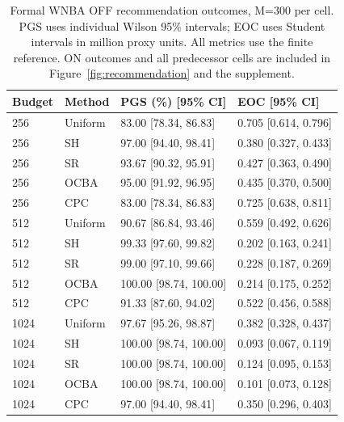 \begin{table}[tbp]\centering\footnotesize
\caption{Formal WNBA OFF recommendation outcomes, M=300 per cell. PGS uses individual Wilson 95\% intervals; EOC uses Student intervals in million proxy units. All metrics use the finite reference. ON outcomes and all predecessor cells are included in Figure~\ref{fig:recommendation} and the supplement.}\label{tab:recommendation}
\begin{tabularx}{\linewidth}{llXX}\toprule
Budget & Method & PGS (\%) [95\% CI] & EOC [95\% CI] \\ \midrule
256 & Uniform & 83.00 [78.34, 86.83] & 0.705 [0.614, 0.796] \\
256 & SH & 97.00 [94.40, 98.41] & 0.380 [0.327, 0.433] \\
256 & SR & 93.67 [90.32, 95.91] & 0.427 [0.363, 0.490] \\
256 & OCBA & 95.00 [91.92, 96.95] & 0.435 [0.370, 0.500] \\
256 & CPC & 83.00 [78.34, 86.83] & 0.725 [0.638, 0.811] \\
512 & Uniform & 90.67 [86.84, 93.46] & 0.559 [0.492, 0.626] \\
512 & SH & 99.33 [97.60, 99.82] & 0.202 [0.163, 0.241] \\
512 & SR & 99.00 [97.10, 99.66] & 0.228 [0.187, 0.269] \\
512 & OCBA & 100.00 [98.74, 100.00] & 0.214 [0.175, 0.252] \\
512 & CPC & 91.33 [87.60, 94.02] & 0.522 [0.456, 0.588] \\
1024 & Uniform & 97.67 [95.26, 98.87] & 0.382 [0.328, 0.437] \\
1024 & SH & 100.00 [98.74, 100.00] & 0.093 [0.067, 0.119] \\
1024 & SR & 100.00 [98.74, 100.00] & 0.124 [0.095, 0.153] \\
1024 & OCBA & 100.00 [98.74, 100.00] & 0.101 [0.073, 0.128] \\
1024 & CPC & 97.00 [94.40, 98.41] & 0.350 [0.296, 0.403] \\
\bottomrule\end{tabularx}
\end{table}
